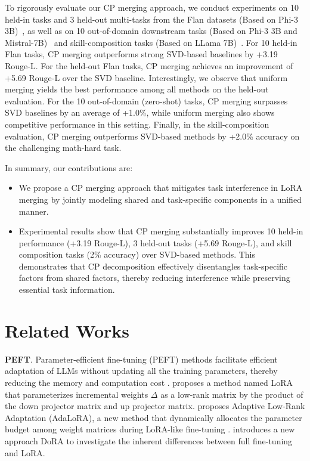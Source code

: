 \documentclass[10pt]{article} %
\begin{document}
To rigorously evaluate our CP merging approach, we conduct experiments on 10 held-in tasks and 3 held-out multi-tasks from the Flan datasets (Based on Phi-3 3B)~\cite{arnob2025exploring}, as well as on 10 out-of-domain downstream tasks (Based on Phi-3 3B and Mistral-7B)~\cite{ostapenko2024towards} and skill-composition tasks (Based on LLama 7B)~\cite{prabhakar2024lora}. For 10 held-in Flan tasks, CP merging outperforms strong SVD-based baselines by +3.19 Rouge-L. For the held-out Flan tasks, CP merging achieves an improvement of +5.69 Rouge-L over the SVD baseline. Interestingly, we observe that uniform merging yields the best performance among all methods on the held-out evaluation. For the 10 out-of-domain (zero-shot) tasks, CP merging surpasses SVD baselines by an average of +1.0\%, while uniform merging also shows competitive performance in this setting. Finally, in the skill-composition evaluation, CP merging outperforms SVD-based methods by +2.0\% accuracy on the challenging math-hard task.

    In summary, our contributions are:

\begin{itemize}
    \item We propose a CP merging approach that mitigates task interference in LoRA merging by jointly modeling shared and task-specific components in a unified manner.  

    \item Experimental results show that CP merging substantially improves 10 held-in performance (+3.19 Rouge-L), 3 held-out tasks (+5.69 Rouge-L), and skill composition tasks (2\% accuracy) over SVD-based methods. This demonstrates that CP decomposition effectively disentangles task-specific factors from shared factors, thereby reducing interference while preserving essential task information.  
\end{itemize}


\section{Related Works}

    \noindent
    \textbf{PEFT}. Parameter-efficient fine-tuning (PEFT) methods facilitate
    efficient adaptation of LLMs without updating all the training parameters, thereby
    reducing the memory and computation cost \citep{adapter_layer,zhang2024llama,zaken2022bitfit,guo2021parameter,li2021prefix,lester2021power}.
    \citet{hu2021lora} proposes a method named LoRA that parameterizes
    incremental weights $\Delta$ as a low-rank matrix by the product of the down
    projector matrix and up projector matrix. \citet{zhang2023adaptive} proposes
    Adaptive Low-Rank Adaptation (AdaLoRA), a new method that dynamically allocates
    the parameter budget among weight matrices during LoRA-like fine-tuning \citep{zhang2023adaptive}.
    \citet{liu2024dora} introduces a new approach DoRA to investigate the
    inherent differences between full fine-tuning and LoRA.
\end{document}
